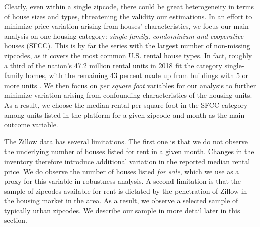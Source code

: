 Clearly, even within a single zipcode, there could be great heterogeneity in terms of 
house sizes and types, threatening the validity our estimations. In an effort to 
minimize price variation arising from houses' characteristics, we focus our main 
analysis on one housing category: \textit{single family, condominium and cooperative} houses
(SFCC). This is by far the series with the largest number of non-missing zipcodes, as 
it covers the most common U.S. rental house types. In fact, roughly a third of the 
nation's 47.2 million rental units in 2018 fit the category single-family homes, with 
the remaining 43 percent made up from buildings with 5 or more units 
\parencite{fernald2020americas}. We then focus on \textit{per square foot} variables 
for our analysis to further minimize variation arising from confounding characteristics
of the housing units. As a result, we choose the median rental per square foot in the 
SFCC category among units listed in the platform for a given zipcode and month as 
the main outcome variable. 

The Zillow data has several limitations. The first one is that we do not observe the 
underlying number of houses listed for rent in a given month. Changes in the inventory 
therefore introduce additional variation in the reported median rental price. We do 
observe the number of houses listed \textit{for sale}, which we use as a proxy for this 
variable in robustness analysis. A second limitation is that the sample of zipcodes 
available for rent is dictated by the penetration of Zillow in the housing market in the 
area. As a result, we observe a selected sample of typically urban zipcodes. We describe 
our sample in more detail later in this section.

